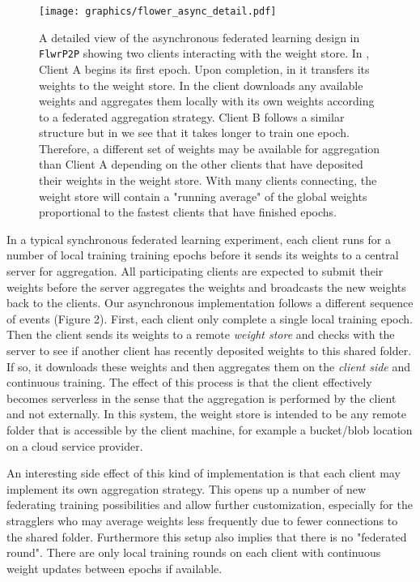\documentclass[twocolumn, switch]{article} %
\begin{document}
\begin{figure}
    \centering
    \texttt{[image: graphics/flower\_async\_detail.pdf]}
    \caption{A detailed view of the asynchronous federated learning design in \texttt{FlwrP2P} showing two clients interacting with the weight store. In , Client A begins its first epoch. Upon completion, in  it transfers its weights to the weight store. In  the client downloads any available weights and aggregates them locally with its own weights according to a federated aggregation strategy. Client B follows a similar structure but in  we see that it takes longer to train one epoch. Therefore, a different set of weights may be available for aggregation than Client A depending on the other clients that have deposited their weights in the weight store. With many clients connecting, the weight store will contain a "running average" of the global weights proportional to the fastest clients that have finished epochs.}
    \label{fig:async-detail}
\end{figure}

In a typical synchronous federated learning experiment, each client runs for a number of local training training epochs before it sends its weights to a central server for aggregation. All participating clients are expected to submit their weights before the server aggregates the weights and broadcasts the new weights back to the clients. Our asynchronous implementation follows a different sequence of events (Figure 2). First, each client only complete a single local training epoch. Then the client sends its weights to a remote \textit{weight store} and checks with the server to see if another client has recently deposited weights to this shared folder. If so, it downloads these weights and then aggregates them on the \textit{client side} and continuous training. The effect of this process is that the client effectively becomes serverless in the sense that the aggregation is performed by the client and not externally. In this system, the weight store is intended to be any remote folder that is accessible by the client machine, for example a bucket/blob location on a cloud service provider.

An interesting side effect of this kind of implementation is that each client may implement its own aggregation strategy. This opens up a number of new federating training possibilities and allow further customization, especially for the stragglers who may average weights less frequently due to fewer connections to the shared folder. Furthermore this setup also implies that there is no "federated round". There are only local training rounds on each client with continuous weight updates between epochs if available. 
\end{document}
